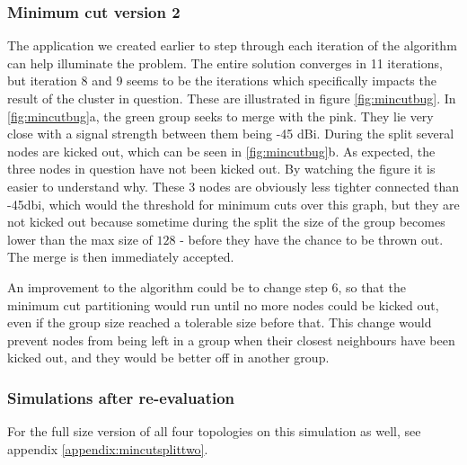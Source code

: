 \subsubsection{Minimum cut version 2}
The application we created earlier to step through each iteration of the algorithm can help illuminate the problem. The entire solution converges in 11 iterations, but iteration 8 and 9 seems to be the iterations which specifically impacts the result of the cluster in question.
These are illustrated in figure \ref{fig:mincutbug}. In \ref{fig:mincutbug}a, the green group seeks to merge with the pink. They lie very close with a signal strength between them being -45 dBi.
During the split several nodes are kicked out, which can be seen in \ref{fig:mincutbug}b. As expected, the three nodes in question have not been kicked out. By watching the figure it is easier to understand why.
These 3 nodes are obviously less tighter connected than -45dbi, which would the threshold for minimum cuts over this graph, but they are not kicked out because sometime during the split the size of the group becomes lower than the max size of $128$ - before they have the chance to be thrown out. The merge is then immediately accepted. 

An improvement to the algorithm could be to change step 6, so that the minimum cut partitioning would run until no more nodes could be kicked out, even if the group size reached a tolerable size before that. This change would prevent nodes from being left in a group when their closest neighbours have been kicked out, and they would be better off in another group.

\subsubsection{Simulations after re-evaluation}
For the full size version of all four topologies on this simulation as well, see appendix \ref{appendix:mincutsplittwo}. 

